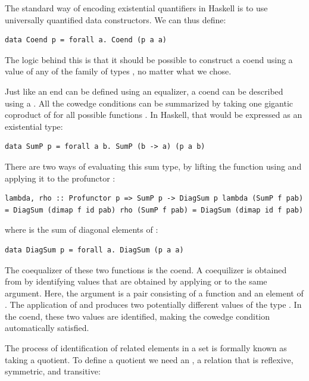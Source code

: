 The standard way of encoding existential quantifiers in Haskell is to
use universally quantified data constructors. We can thus define:

\begin{verbatim}
data Coend p = forall a. Coend (p a a)
\end{verbatim}

The logic behind this is that it should be possible to construct a coend
using a value of any of the family of types , no matter
what  we chose.

Just like an end can be defined using an equalizer, a coend can be
described using a . All the cowedge conditions can be
summarized by taking one gigantic coproduct of  for all
possible functions . In Haskell, that would be
expressed as an existential type:

\begin{verbatim}
data SumP p = forall a b. SumP (b -> a) (p a b)
\end{verbatim}

There are two ways of evaluating this sum type, by lifting the function
using  and applying it to the profunctor :

\begin{verbatim}
lambda, rho :: Profunctor p => SumP p -> DiagSum p lambda (SumP f pab) = DiagSum (dimap f id pab) rho (SumP f pab) = DiagSum (dimap id f pab)
\end{verbatim}

where  is the sum of diagonal elements of :

\begin{verbatim}
data DiagSum p = forall a. DiagSum (p a a)
\end{verbatim}

The coequalizer of these two functions is the coend. A coequilizer is
obtained from  by identifying values that are
obtained by applying  or  to the same
argument. Here, the argument is a pair consisting of a function
 and an element of . The
application of  and  produces two potentially
different values of the type . In the coend, these
two values are identified, making the cowedge condition automatically
satisfied.

The process of identification of related elements in a set is formally
known as taking a quotient. To define a quotient we need an
 \code{\textasciitilde{}}, a relation that
is reflexive, symmetric, and transitive:

